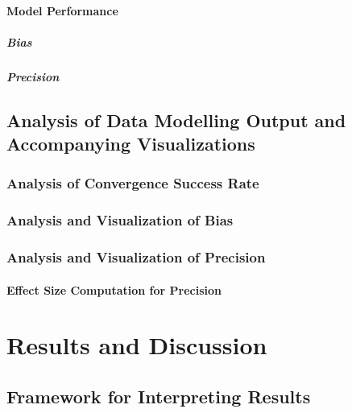 \documentclass[
12pt, %
twoside,
english]{guelphthesis}
\begin{document}
\hypertarget{model-performance}{%
\paragraph{Model Performance}\label{model-performance}}

\hypertarget{bias-comp}{%
\subparagraph{Bias}\label{bias-comp}}

\hypertarget{pres-precision}{%
\subparagraph{Precision}\label{pres-precision}}

\hypertarget{analysis-visualization}{%
\subsection{Analysis of Data Modelling Output and Accompanying Visualizations}\label{analysis-visualization}}

\hypertarget{convergence-analysis}{%
\subsubsection{Analysis of Convergence Success Rate}\label{convergence-analysis}}

\hypertarget{bias-analysis}{%
\subsubsection{Analysis and Visualization of Bias}\label{bias-analysis}}

\hypertarget{precision-analysis}{%
\subsubsection{Analysis and Visualization of Precision}\label{precision-analysis}}

\hypertarget{effect-size-computation-for-precision}{%
\paragraph{Effect Size Computation for Precision}\label{effect-size-computation-for-precision}}

\hypertarget{results-and-discussion}{%
\section{Results and Discussion}\label{results-and-discussion}}

\hypertarget{framework-for-interpreting-results}{%
\subsection{Framework for Interpreting Results}\label{framework-for-interpreting-results}}
\end{document}
